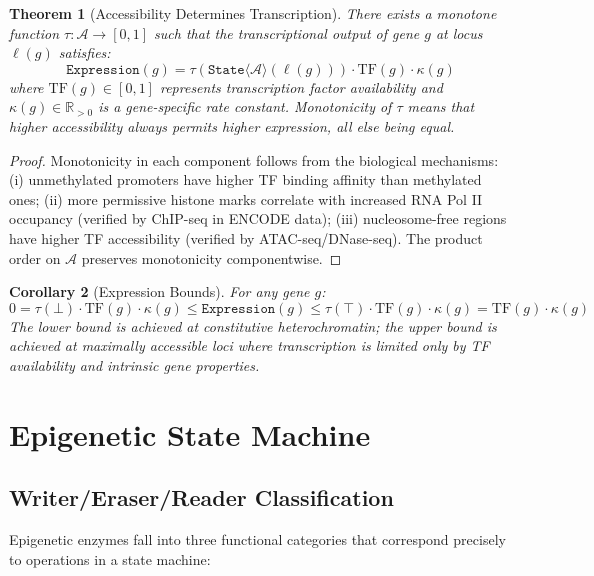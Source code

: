 \documentclass[12pt,a4paper]{article}
\newtheorem{theorem}{Theorem}[section]
\newtheorem{corollary}[theorem]{Corollary}
\newcommand{\StateT}{\texttt{State}}
\newcommand{\Expr}{\texttt{Expression}}
\begin{document}
\begin{theorem}[Accessibility Determines Transcription]
\label{thm:acc-transcription}
There exists a monotone function $\tau : \mathcal{A} \to [0,1]$ such that the transcriptional output of gene $g$ at locus $\ell(g)$ satisfies:
\[
    \Expr(g) = \tau\!\left(\StateT\langle\mathcal{A}\rangle(\ell(g))\right) \cdot \mathrm{TF}(g) \cdot \kappa(g)
\]
where $\mathrm{TF}(g) \in [0,1]$ represents transcription factor availability and $\kappa(g) \in \mathbb{R}_{>0}$ is a gene-specific rate constant. Monotonicity of $\tau$ means that higher accessibility always permits higher expression, all else being equal.
\end{theorem}

\begin{proof}
Monotonicity in each component follows from the biological mechanisms: (i) unmethylated promoters have higher TF binding affinity than methylated ones; (ii) more permissive histone marks correlate with increased RNA Pol II occupancy (verified by ChIP-seq in ENCODE data); (iii) nucleosome-free regions have higher TF accessibility (verified by ATAC-seq/DNase-seq). The product order on $\mathcal{A}$ preserves monotonicity componentwise.
\end{proof}

\begin{corollary}[Expression Bounds]
\label{cor:expr-bounds}
For any gene $g$:
\[
    0 = \tau(\bot) \cdot \mathrm{TF}(g) \cdot \kappa(g) \leq \Expr(g) \leq \tau(\top) \cdot \mathrm{TF}(g) \cdot \kappa(g) = \mathrm{TF}(g) \cdot \kappa(g)
\]
The lower bound is achieved at constitutive heterochromatin; the upper bound is achieved at maximally accessible loci where transcription is limited only by TF availability and intrinsic gene properties.
\end{corollary}

\section{Epigenetic State Machine}
\label{sec:state-machine}

\subsection{Writer/Eraser/Reader Classification}

Epigenetic enzymes fall into three functional categories that correspond precisely to operations in a state machine:
\end{document}
